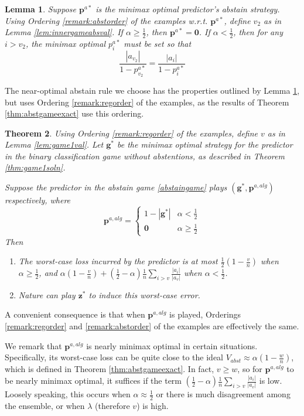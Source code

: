 \documentclass{article}[12pt]
\newtheorem{thm}{Theorem}%
\newtheorem{lem}[thm]{Lemma}
\theoremstyle{named}
\newcommand{\vg}{\mathbf{g}}    %
\newcommand{\vp}{\mathbf{p}}
\newcommand{\vz}{\mathbf{z}}
\newcommand{\vzero}{\mathbf{0}}
\newcommand{\abs}[1]{\left| #1 \right|}
\newcommand{\lrp}[1]{\left(#1\right)}
\begin{document}
\begin{lem}
\label{lem:gameabssolnprop}
Suppose $\vp^{a*}$ is the minimax optimal predictor's abstain strategy. 
Using Ordering \ref{remark:abstorder} of the examples w.r.t. $\vp^{a*}$, 
define $v_2$ as in Lemma \ref{lem:innergameabsval}.
If $\alpha \geq \frac{1}{2}$, then $\vp^{a*} = \vzero$.
If $\alpha < \frac{1}{2}$, then for any $i > v_2$, the minimax optimal $p_i^{a*}$ must be set so that 
$$\frac{\abs{a_{v_2} }}{1 - p_{v_2}^{a*}} = \frac{\abs{a_i }}{1 - p_{i}^{a*}}$$
\end{lem}

The near-optimal abstain rule we choose has the properties outlined by Lemma \ref{lem:gameabssolnprop}, 
but uses Ordering \ref{remark:regorder} of the examples, 
as the results of Theorem \ref{thm:abstgameexact} use this ordering.
\begin{thm}
\label{thm:gameabsapprox}
Using Ordering \ref{remark:regorder} of the examples, 
define $v$ as in Lemma \ref{lem:game1val}. 
Let $\vg^*$ be the minimax optimal strategy for the predictor 
in the binary classification game without abstentions, 
as described in Theorem \ref{thm:game1soln}.

Suppose the predictor in the abstain game \eqref{abstaingame} plays $(\vg^*, \vp^{a, alg})$ respectively, where
$$\vp^{a, alg} = \begin{cases} 1 - \abs{\vg^*} & \alpha < \frac{1}{2} \\ \vzero & \alpha \geq \frac{1}{2} \end{cases} $$
Then
\begin{enumerate}
\item
The worst-case loss incurred by the predictor is at most
$\displaystyle \frac{1}{2} \lrp{1 - \frac{v}{n}}$ when $\alpha \geq \frac{1}{2}$, 
and %
$\alpha \lrp{1 - \frac{v}{n}} + \lrp{ \frac{1}{2} - \alpha } \frac{1}{n} \sum_{i>v} \frac{\abs{a_i}}{\abs{a_v}}$ 
when $\alpha < \frac{1}{2}$.
\item
Nature can play $\vz^*$ to induce this worst-case error.
\end{enumerate} 
\end{thm}

A convenient consequence is that when $\vp^{a,alg}$ is played, 
Orderings \ref{remark:regorder} and \ref{remark:abstorder} of the examples are effectively the same.

We remark that $\vp^{a,alg}$ is nearly minimax optimal in certain situations. 
Specifically, its worst-case loss can be quite close to the ideal $V_{abst} \approx \alpha \lrp{1 - \frac{w}{n}}$, 
which is defined in Theorem \ref{thm:abstgameexact}. 
In fact, $v \geq w$, so for $\vp^{a,alg}$ to be nearly minimax optimal, 
it suffices if the term $\lrp{ \frac{1}{2} - \alpha } \frac{1}{n} \sum_{i>v} \frac{\abs{a_i}}{\abs{a_v}}$ 
is low.
Loosely speaking, this occurs when $\alpha \approx \frac{1}{2}$ or there is much disagreement among the ensemble, 
or when $\lambda$ (therefore $v$) is high. 
\end{document}
